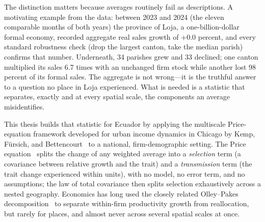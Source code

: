 \documentclass[conference]{IEEEtran}
\begin{document}
The distinction matters because averages routinely fail as descriptions.
A motivating example from the data: between 2023 and 2024 (the eleven
comparable months of both years) the province of
Loja, a one-billion-dollar formal economy, recorded aggregate real sales
growth of $+0.0$ percent, and every standard robustness check (drop the
largest canton, take the median parish) confirms that number. Underneath, 34
parishes grew and 33 declined; one canton multiplied its sales 6.7 times
with an unchanged firm stock while another lost 98 percent of its formal
sales. The aggregate is not wrong---it is the truthful answer to a question
no place in Loja experienced. What is needed is a statistic that separates,
exactly and at every spatial scale, the components an average misidentifies.

This thesis builds that statistic for Ecuador by applying the multiscale
Price-equation framework developed for urban income dynamics in
Chicago by Kemp, F\"ursich, and Bettencourt~\cite{kemp2025} to a national,
firm-demographic setting. The Price equation~\cite{price1970,frank2012}
splits the change of any weighted average into a \textit{selection} term (a
covariance between relative growth and the trait) and a \textit{transmission}
term (the trait change experienced within units), with no model, no error
term, and no assumptions; the law of total covariance then splits selection
exhaustively across a nested geography. Economics has long used the closely
related Olley--Pakes decomposition~\cite{olleypakes1996,melitz2015} to
separate within-firm productivity growth from reallocation, but rarely for
places, and almost never across several spatial scales at once.
\end{document}
